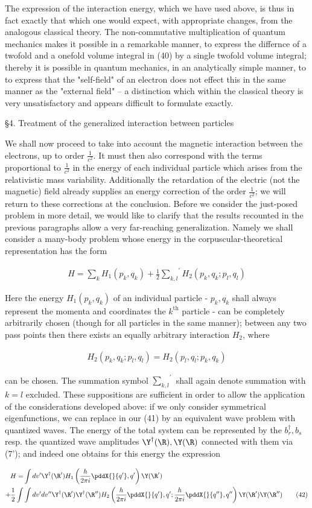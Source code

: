 \documentclass{article}
\newcommand{\nequ}[2]{
\begin{align*}
#1
\tag{#2}
\end{align*}
}
\newcommand{\uequ}[1]{
\begin{align*}
#1
\end{align*}
}
\newcommand{\sumX}[1]{\underset{#1}{\sum}}
\begin{document}
The expression of the interaction energy, which we have used above, is thus in fact exactly that which one would expect, with appropriate changes, from the analogous classical theory. The non-commutative multiplication of quantum mechanics makes it possible in a remarkable manner, to express the differnce of a twofold and a onefold volume integral in (40) by a single twofold volume integral; thereby it is possible in quantum mechanics, in an analytically simple manner, to to express that the "self-field" of an electron does not effect this in the same manner as the "external field" -- a distinction which within the classical theory is very unsatisfactory and appears difficult to formulate exactly.

§4. Treatment of the generalized interaction between particles

We shall now proceed to take into account the magnetic interaction between the electrons, up to order $\frac{1}{c^2}$. It must then also correspond with the terms proportional to $\frac{1}{c^2}$ in the energy of each individual particle which arises from the relativistic mass variability. Additionally the retardation of the electric (not the magnetic) field already supplies an energy correction of the order $\frac{1}{c^2}$; we will return to these corrections at the conclusion. Before we consider the just-posed problem in more detail, we would like to clarify that the results recounted in the previous paragraphs allow a very far-reaching generalization. Namely we shall consider a many-body problem whose energy in the corpuscular-theoretical representation has the form
\nequ{
H=\sumX{k}H_1(p_k,q_k) + \frac{1}{2}\sumX{k,l}^{\prime}H_2(p_k,q_k;p_l,q_l)
}{41}
Here the energy $H_1(p_k,q_k)$ of an individual particle - $p_k,q_k$ shall always represent the momenta and coordinates the $k^{\text{th}}$ particle - can be completely arbitrarily chosen (though for all particles in the same manner); between any two pass points then there exists an equally arbitrary interaction $H_2$, where
\uequ{
H_2(p_k,q_k;p_l,q_l) = H_2(p_l,q_l;p_k,q_k)
}
can be chosen. The summation symbol $\sumX{k,l}^{\prime}$ shall again denote summation with $k=l$ excluded. These suppositions are sufficient in order to allow the application of the considerations developed above: if we only consider symmetrical eigenfunctions, we can replace in our (41) by an equivalent wave problem with quantized waves. The energy of the total system can be represented by the $b^{\dagger}_r,b_s$ resp. the quantized wave amplitudes $\Y^{\dagger}(\R),\Y(\R)$ connected with them via (7'); and indeed one obtains for this energy the expression
\nequ{
H = &\int dv' \Y^\dagger(\R') H_1\left(\frac{h}{2\pi i}\pddX{}{q'}, q'\right)\Y(\R')\\
+\frac{1}{2}\int & \int dv' dv'' \Y^\dagger(\R')\Y^\dagger(\R'')
H_2\left(\frac{h}{2\pi i}\pddX{}{q'}, q';\frac{h}{2\pi i}\pddX{}{q''}, q''\right)\Y(\R')\Y(\R'')
}{42}
\end{document}
